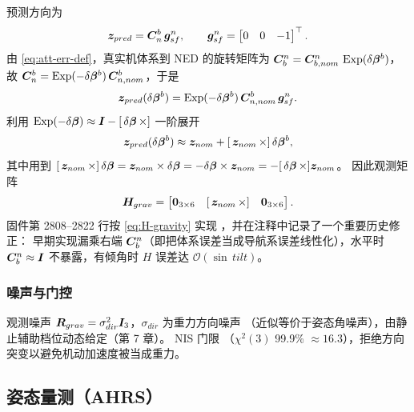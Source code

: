 预测方向为
\begin{equation}
  \boldsymbol{z}_{pred} = \boldsymbol{C}_n^b\,\boldsymbol{g}_{sf}^n,
  \qquad
  \boldsymbol{g}_{sf}^n = \begin{bmatrix} 0 & 0 & -1 \end{bmatrix}^{\top}.
  \label{eq:z-grav-pred}
\end{equation}
由 \cref{eq:att-err-def}，真实机体系到 NED 的旋转矩阵为
$\boldsymbol{C}_b^n = \boldsymbol{C}_{b,nom}^n\,\operatorname{Exp}(\delta\boldsymbol{\beta}^b)$，故
$\boldsymbol{C}_n^b = \operatorname{Exp}(-\delta\boldsymbol{\beta}^b)\,\boldsymbol{C}_{n,nom}^b$，于是
\begin{equation}
  \boldsymbol{z}_{pred}(\delta\boldsymbol{\beta}^b)
  = \operatorname{Exp}(-\delta\boldsymbol{\beta}^b)\,\boldsymbol{C}_{n,nom}^b\,\boldsymbol{g}_{sf}^n.
  \label{eq:z-grav-pert}
\end{equation}
利用 $\operatorname{Exp}(-\delta\boldsymbol{\beta})\approx \boldsymbol{I} - [\,\delta\boldsymbol{\beta}\,\times]$ 一阶展开
\begin{equation}
  \boldsymbol{z}_{pred}(\delta\boldsymbol{\beta}^b)
  \approx \boldsymbol{z}_{nom} + [\,\boldsymbol{z}_{nom}\,\times]\,\delta\boldsymbol{\beta}^b,
  \label{eq:z-grav-lin}
\end{equation}
其中用到 $[\,\boldsymbol{z}_{nom}\,\times]\,\delta\boldsymbol{\beta} = \boldsymbol{z}_{nom}\times\delta\boldsymbol{\beta}
= -\delta\boldsymbol{\beta}\times\boldsymbol{z}_{nom} = -[\,\delta\boldsymbol{\beta}\,\times]\boldsymbol{z}_{nom}$。
因此观测矩阵
\begin{equation}
  \boldsymbol{H}_{grav} = \begin{bmatrix} \boldsymbol{0}_{3\times6} & [\,\boldsymbol{z}_{nom}\,\times] &
    \boldsymbol{0}_{3\times6} \end{bmatrix}.
  \label{eq:H-gravity}
\end{equation}
固件第 2808--2822 行按 \cref{eq:H-gravity} 实现
，并在注释中记录了一个重要历史修正：
早期实现漏乘右端 $\boldsymbol{C}_b^n$（即把体系误差当成导航系误差线性化），水平时
$\boldsymbol{C}_b^n\approx\boldsymbol{I}$ 不暴露，有倾角时 $H$ 误差达 $\mathcal{O}(\sin\,
tilt)$。

\subsubsection{噪声与门控}

观测噪声 $\boldsymbol{R}_{grav} = \sigma_{dir}^2\boldsymbol{I}_3$，$\sigma_{dir}$ 为重力方向噪声
（近似等价于姿态角噪声），由静止辅助档位动态给定（第 7 章）。
NIS 门限 （$\chi^2(3)$ 99.9\%
$\approx16.3$），拒绝方向突变以避免机动加速度被当成重力。

\subsection{姿态量测（AHRS）}

